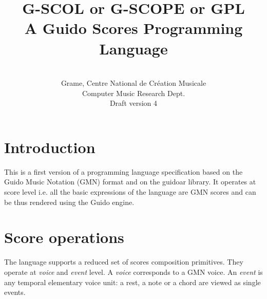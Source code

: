 \documentclass[10pt,a4paper,frenchb]{article}
\begin{document}
\title{\textbf{\textsc{G-SCOL}} or \textbf{\textsc{G-SCOPE}} or \textbf{\textsc{GPL}} \\
A Guido Scores Programming Language}


\author{
\\
Grame, Centre National de Création Musicale \\
Computer Music Research Dept.\\
Draft version 4 
}

\maketitle

\section{Introduction}

This is a first version of a programming language specification based on the Guido Music Notation (GMN) format and on the guidoar library. It operates at score level i.e. all the basic expressions of the language are GMN scores and can be thus rendered using the Guido engine. 


\section{Score operations}

The language supports a reduced set of scores composition primitives.
They operate at \emph{voice} and \emph{event} level. 
A \emph{voice} corresponds to a GMN voice.
An \emph{event} is any temporal elementary voice unit: a rest, a note or a chord are viewed as single events.
\end{document}
